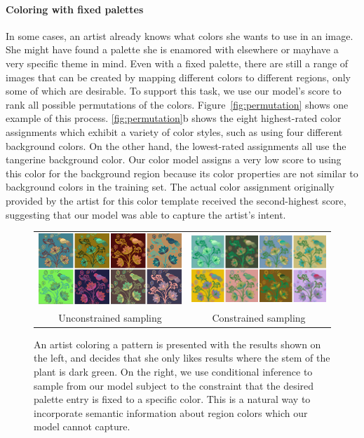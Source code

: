 \paragraph{Coloring with fixed palettes} In some cases, an artist already knows what colors she wants to use in an image. She might have found a palette she is enamored with elsewhere or mayhave a very specific theme in mind. Even with a fixed palette, there are still a range of images that can be created by mapping different colors to different regions, only some of which are desirable. To support this task, we use our model's score to rank all possible permutations of the colors. Figure~\ref{fig:permutation} shows one example of this process. \ref{fig:permutation}b shows the eight highest-rated color assignments which exhibit a variety of color styles, such as using four different background colors. On the other hand, the lowest-rated assignments all use the tangerine background color. Our color model assigns a very low score to using this color for the background region because its color properties are not similar to background colors in the training set. The actual color assignment originally provided by the artist for this color template received the second-highest score, suggesting that our model was able to capture the artist's intent.

\begin{figure}[ht]
\begin{tabular}{cc} 
\includegraphics[width=.475\linewidth]{figs/constrainedSearchUnconstrained}&\includegraphics[width=.475\linewidth]{figs/constrainedSearchConstrained}\\
Unconstrained sampling&Constrained sampling\\
\end{tabular}

\caption{An artist coloring a pattern is presented with the results shown on the left, and decides that she only likes results where the stem of the plant is dark green. On the right, we use conditional inference to sample from our model subject to the constraint that the desired palette entry is fixed to a specific color. This is a natural way to incorporate semantic information about region colors which our model cannot capture.}
\label{fig:constrainedInference}
\vspace{-1.0em}
\end{figure}

